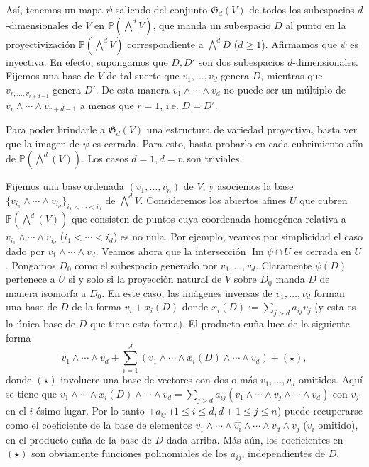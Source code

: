 \documentclass[spanish,12pt]{amsart}
\theoremstyle{definition}
\theoremstyle{remark}
\numberwithin{equation}{section}
\newcommand{\Imagen}{\operatorname{Im}}
\renewcommand{\hat}[1]{\widehat{#1}}
\begin{document}
Así, tenemos un mapa $\psi$ saliendo del conjunto $\mathfrak G_d (V)$ de todos los subespacios $d$-dimensionales de $V$ en $\mathbb{P} (\bigwedge^d V)$, que manda un subespacio $D$ al punto en la proyectivización $\mathbb{P} (\bigwedge^d V)$ correspondiente a $\bigwedge^d D$ ($d \geq 1$). Afirmamos que $\psi$ es inyectiva. En efecto, supongamos que $D,D'$ son dos subespacios $d$-dimensionales. Fijemos una base de $V$ de tal suerte que $v_1, \ldots, v_d$ genera $D$, mientras que $v_{r, \ldots, v_{r + d - 1}}$ genera $D'$. De esta manera $v_1 \wedge \cdots \wedge v_d$ no puede ser un múltiplo de $v_r \wedge \cdots \wedge v_{r+d - 1}$ a menos que $r = 1$, i.e. $D = D'$.

Para poder brindarle a $\mathfrak G _d (V)$ una estructura de variedad proyectiva, basta ver que la imagen de $\psi$ es cerrada. Para esto, basta probarlo en cada cubrimiento afín de $\mathbb{P}(\bigwedge^d (V))$. Los casos $d = 1, d = n$ son triviales.

Fijemos una base ordenada $(v_1, \ldots, v_n)$ de $V$, y asociemos la base $\{v_{i_1} \wedge \cdots \wedge v_{i_d}\}_{i_1 < \cdots < i_d}$ de $\bigwedge^d V$. Consideremos los abiertos afines $U$ que cubren $\mathbb{P} (\bigwedge^d (V))$ que consisten de puntos cuya coordenada homogénea relativa a $v_{i_1} \wedge \cdots \wedge v_{i_d}$ ($i_1 < \cdots < i_d$) es no nula. Por ejemplo, veamos por simplicidad el caso dado por $v_1 \wedge \cdots \wedge v_d$. Veamos ahora que la intersección $\Imagen \psi \cap U$ es cerrada en $U$. Pongamos $D_0$ como el subespacio generado por $v_1, \ldots, v_d$. Claramente $\psi (D)$ pertenece a $U$ si y solo si la proyección natural de $V$ sobre $D_0$ manda $D$ de manera isomorfa a $D_0$. En este caso, las imágenes inversas de $v_1, \ldots, v_d$ forman una base de $D$ de la forma $v_i + x_i (D)$ donde $x_i (D) := \sum_{j > d} a_{ij} v_j$ (y esta es la única base de $D$ que tiene esta forma). El producto cuña luce de la siguiente forma
\[
    v_1 \wedge \cdots \wedge v_d + \sum_{i = 1}^d (v_1 \wedge \cdots \wedge x_i (D) \wedge \cdots \wedge v_d) + (\star),
\]
donde $(\star)$ involucre una base de vectores con dos o más $v_1, \ldots, v_d$ omitidos. Aquí se tiene que $v_1 \wedge \cdots \wedge x_i (D) \wedge \cdots \wedge v_d = \sum_{j > d} a_{ij} (v_1 \wedge \cdots \wedge v_j \wedge \cdots \wedge v_d)$ con $v_j$ en el $i$-ésimo lugar. Por lo tanto $\pm a_{ij}$ ($ 1 \leq i \leq d, d + 1 \leq j \leq n$) puede recuperarse como el coeficiente de la base de elementos $v_1 \wedge \cdots \wedge \hat {v_i} \wedge \cdots \wedge v_d \wedge v_j$ ($v_i$ omitido), en el producto cuña de la base de $D$ dada arriba. Más aún, los coeficientes en $(\star)$ son obviamente funciones polinomiales de los $a_{ij}$, independientes de $D$.
\end{document}
